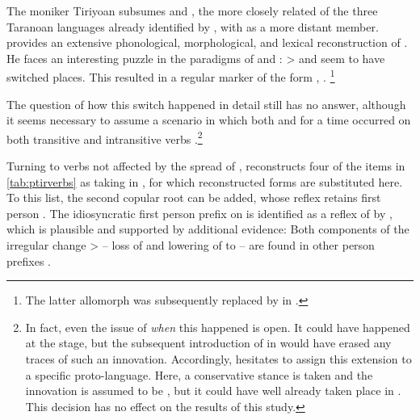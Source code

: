 


\subsubsection{\PTir {}}
\label{sec:taranoan}
The moniker Tiriyoan \parencite{glottolog} subsumes \trio and \akuriyo, the more closely related of the three Taranoan languages already identified by \textcite{girard1971proto}, with \carijo as a more distant member.
\textcite{meira1998proto} provides an extensive phonological, morphological, and lexical reconstruction of \PTar.
He faces an interesting puzzle in the \setone paradigms of \trio and \akuriyo: \PC {}>  and   seem to have switched places.
This resulted in a regular  marker of the form ,  .%
\footnote{The latter allomorph was subsequently replaced by  in \akuriyo {}.}

The question of how this switch happened in detail \parencite[107--112]{meira1998proto} still has no answer, although it seems necessary to assume a scenario in which both  and  for a time occurred on both transitive and intransitive verbs \parencite[112]{meira1998proto}.\footnote{
In fact, even the issue of \emph{when} this happened is open.
It could have happened at the \PTar stage, but the subsequent introduction of  in \carijo {} would have erased any traces of such an innovation.
Accordingly, \textcite{meira1998proto} hesitates to assign this extension to a specific proto-language.
Here, a conservative stance is taken and the innovation is assumed to be \PTir, but it could have well already taken place in \PTar.
This decision has no effect on the results of this study.}



Turning to verbs not affected by the spread of , \textcite{meira1998proto} reconstructs four of the items in \cref{tab:ptirverbs} as taking  in \PTar, for which reconstructed \PTir forms are substituted here.
To this list, the second copular root  can be added, whose \trio reflex retains first person .
The idiosyncratic \akuriyo first person prefix  on  is identified as a reflex of  by 
\textcite[113]{meira1998proto}, which is plausible and supported by additional evidence:
Both components of the irregular change  >  -- loss of  and lowering of  to  -- are found in other person prefixes .

